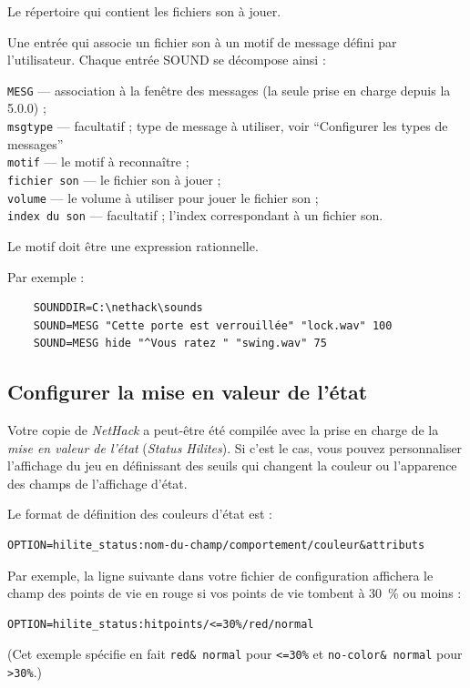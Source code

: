 \documentclass[titlepage]{article}
\begin{document}
\begin{description}[font=\mdseries\itshape]
\item[SOUNDDIR]
Le répertoire qui contient les fichiers son à jouer.
\item[SOUND]
Une entrée qui associe un fichier son à un motif de message défini par l'utilisateur.
Chaque entrée SOUND se décompose ainsi :

\texttt{MESG} --- association à la fenêtre des messages (la seule prise en charge depuis la 5.0.0) ;\\
\texttt{msgtype} --- facultatif ; type de message à utiliser, voir ``Configurer les types de messages''\\
\texttt{motif} --- le motif à reconnaître ;\\
\texttt{fichier son} --- le fichier son à jouer ;\\
\texttt{volume} --- le volume à utiliser pour jouer le fichier son ;\\
\texttt{index du son} --- facultatif ; l'index correspondant à un fichier son.
\end{description}

Le motif doit être une expression rationnelle.

Par exemple :

\begin{verbatim}
    SOUNDDIR=C:\nethack\sounds
    SOUND=MESG "Cette porte est verrouillée" "lock.wav" 100
    SOUND=MESG hide "^Vous ratez " "swing.wav" 75
\end{verbatim}

\subsection*{Configurer la mise en valeur de l'état}

Votre copie de \textit{NetHack} a peut-être été compilée avec la prise en charge
de la \textit{mise en valeur de l'état} (\textit{Status Hilites}).
Si c'est le cas, vous pouvez personnaliser l'affichage du jeu en définissant des
seuils qui changent la couleur ou l'apparence des champs de l'affichage d'état.

Le format de définition des couleurs d'état est :\\
\begin{verbatim}
OPTION=hilite_status:nom-du-champ/comportement/couleur&attributs
\end{verbatim}

Par exemple, la ligne suivante dans votre fichier de configuration affichera
le champ des points de vie en rouge si vos points de vie
tombent à 30~\% ou moins :\\
\begin{verbatim}
OPTION=hilite_status:hitpoints/<=30%/red/normal
\end{verbatim}
(Cet exemple spécifie en fait \texttt{red\& normal} pour  \texttt{<=30\%}
et \texttt{no-color\& normal} pour \texttt{>30\%}.)\\
\end{document}
